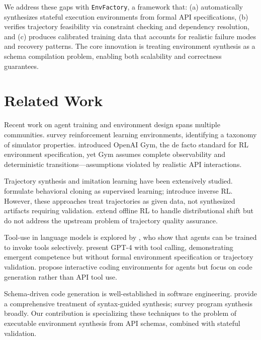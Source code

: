 \documentclass[11pt,a4paper]{article}
\begin{document}
We address these gaps with \texttt{EnvFactory}, a framework that: (a) automatically synthesizes stateful execution environments from formal API specifications, (b) verifies trajectory feasibility via constraint checking and dependency resolution, and (c) produces calibrated training data that accounts for realistic failure modes and recovery patterns. The core innovation is treating environment synthesis as a schema compilation problem, enabling both scalability and correctness guarantees.

\section{Related Work}

Recent work on agent training and environment design spans multiple communities. \citet{kirk2023survey} survey reinforcement learning environments, identifying a taxonomy of simulator properties. \citet{gym2016openai} introduced OpenAI Gym, the de facto standard for RL environment specification, yet Gym assumes complete observability and deterministic transitions—assumptions violated by realistic API interactions.

Trajectory synthesis and imitation learning have been extensively studied. \citet{ho2016generative} formulate behavioral cloning as supervised learning; \citet{abbeel2004apprenticeship} introduce inverse RL. However, these approaches treat trajectories as given data, not synthesized artifacts requiring validation. \citet{kidambi2021offline} extend offline RL to handle distributional shift but do not address the upstream problem of trajectory quality assurance.

Tool-use in language models is explored by \citet{schoop2023toolformer}, who show that agents can be trained to invoke tools selectively. \citet{brown2023language} present GPT-4 with tool calling, demonstrating emergent competence but without formal environment specification or trajectory validation. \citet{trivedi2024intercode} propose interactive coding environments for agents but focus on code generation rather than API tool use.

Schema-driven code generation is well-established in software engineering. \citet{alur2013syntax} provide a comprehensive treatment of syntax-guided synthesis; \citet{gulwani2017program} survey program synthesis broadly. Our contribution is specializing these techniques to the problem of executable environment synthesis from API schemas, combined with stateful validation.
\end{document}
